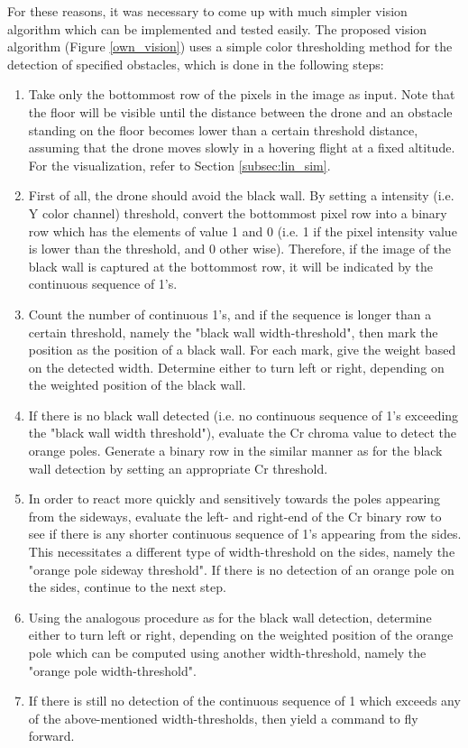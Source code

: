 For these reasons, it was necessary to come up with much simpler vision algorithm which can be implemented and tested easily. The proposed vision algorithm (Figure \ref{own_vision}) uses a simple color thresholding method for the detection of specified obstacles, which is done in the following steps:
\begin{enumerate}
	\item Take only the bottommost row of the pixels in the image as input. Note that the floor will be visible until the distance between the drone and an obstacle standing on the floor becomes lower than a certain threshold distance, assuming that the drone moves slowly in a hovering flight at a fixed altitude. For the visualization, refer to Section \ref{subsec:lin_sim}.
	\item First of all, the drone should avoid the black wall. By setting a intensity (i.e. Y color channel)  threshold, convert the bottommost pixel row into a binary row which has the elements of value 1 and 0 (i.e. 1 if the pixel intensity value is lower than the threshold, and 0 other wise). Therefore, if the image of the black wall is captured at the bottommost row, it will be indicated by the continuous sequence of 1's.
	\item Count the number of continuous 1's, and if the sequence is longer than a certain threshold, namely the "black wall width-threshold", then mark the position as the position of a black wall. For each mark, give the weight based on the detected width. Determine either to turn left or right, depending on the weighted position of the black wall. 
	\item If there is no black wall detected (i.e. no continuous sequence of 1's exceeding the "black wall width threshold"), evaluate the Cr chroma value to detect the orange poles. Generate a binary row in the similar manner as for the black wall detection by setting an appropriate Cr threshold. 
	\item In order to react more quickly and sensitively towards the poles appearing from the sideways, evaluate the left- and right-end of the Cr binary row to see if there is any shorter continuous sequence of 1's appearing from the sides. This necessitates a different type of width-threshold on the sides, namely the "orange pole sideway threshold". If there is no detection of an orange pole on the sides, continue to the next step.
	\item Using the analogous procedure as for the black wall detection, determine either to turn left or right, depending on the weighted position of the orange pole which can be computed using another width-threshold, namely the "orange pole width-threshold".
	\item If there is still no detection of the continuous sequence of 1 which exceeds any of the above-mentioned width-thresholds, then yield a command to fly forward.
\end{enumerate}

